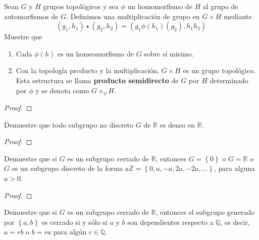 \documentclass[12pt]{report}
\theoremstyle{largebreak}
\begin{document}
    \begin{excer}
        Sean $G$ y $H$ grupos topológicos y sea $\phi$ un homomorfismo de $H$ al grupo de automorfismos de $G$. Definimos una multiplicación de grupo en $G\times H$ mediante
        \begin{equation*}
            (g_1,h_1)\star(g_2,h_2)=(g_1\phi(h_1)(g_2),h_1h_2)
        \end{equation*}
        Muestre que
        \begin{enumerate}
            \item Cada $\phi(h)$ es un homeomorfismo de $G$ sobre sí misimo.
            \item Con la topología producto y la multiplicación, $G\times H$ es un grupo topológico. Esta estructura se llama \textbf{producto semidirecto} de $G$ por $H$ determinado por $\phi$ y se denota como $G\times_{\phi}H$.
        \end{enumerate}
    \end{excer}

    \begin{proof}
        
    \end{proof}

    \begin{excer}
        Demuestre que todo subgrupo no discreto $G$ de $\mathbb{R}$ es denso en $\mathbb{R}$.
    \end{excer}

    \begin{proof}
        
    \end{proof}

    \begin{excer}
        Demuestre que si $G$ es un subgrupo cerrado de $\mathbb{R}$, entonces $G=\left\{0 \right\}$ o $G=\mathbb{R}$ o $G$ es un subgrupo discreto de la forma $a\mathbb{Z}=\left\{0,a,-a,2a,-2a,... \right\}$, para alguna $a>0$.
    \end{excer}

    \begin{proof}
        
    \end{proof}

    \begin{excer}
        Demuestre que si $G$ es un subgrupo cerrado de $\mathbb{R}$, entonces el subgrupo generado por $\left\{a,b\right\}$ es cerrado si y sólo si $a$ y $b$ son dependientes respecto a $\mathbb{Q}$, es decir, $a=rb$ o $b=ra$ para algún $r\in\mathbb{Q}$.
    \end{excer}
\end{document}
